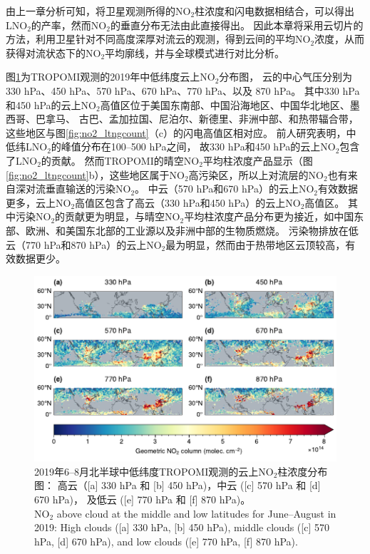 由上一章分析可知，将卫星观测所得的NO$_2$柱浓度和闪电数据相结合，可以得出LNO$_2$的产率，然而NO$_2$的垂直分布无法由此直接得出。
因此本章将采用云切片的方法，利用卫星针对不同高度深厚对流云的观测，得到云间的平均NO$_2$浓度，从而获得对流状态下的NO$_2$平均廓线，并与全球模式进行对比分析。

图\ref{fig:no2geo_tropomi}为TROPOMI观测的2019年中低纬度云上NO$_2$分布图，
云的中心气压分别为330 hPa、450 hPa、570 hPa、670 hPa、770 hPa、以及 870 hPa。
其中330 hPa和450 hPa的云上NO$_2$高值区位于美国东南部、中国沿海地区、中国华北地区、墨西哥、巴拿马、
古巴、孟加拉国、尼泊尔、新德里、非洲中部、和热带辐合带，
这些地区与图\ref{fig:no2_ltngcount}（c）的闪电高值区相对应。
前人研究表明，中低纬LNO$_2$的峰值分布在100--500 hPa之间\citep{Pickering.1988,Ott.2010,Luo.2017}，
故330 hPa和450 hPa的云上NO$_2$包含了LNO$_2$的贡献。
然而TROPOMI的晴空NO$_2$平均柱浓度产品显示（图\ref{fig:no2_ltngcount}b），这些地区属于NO$_2$高污染区，所以上对流层的NO$_2$也有来自深对流垂直输送的污染NO$_2$。
中云（570 hPa和670 hPa）的云上NO$_2$有效数据更多，云上NO$_2$高值区包含了高云（330 hPa和450 hPa）的云上NO$_2$高值区。
其中污染NO$_2$的贡献更为明显，与晴空NO$_2$平均柱浓度产品分布更为接近，如中国东部、欧洲、和美国东北部的工业源以及非洲中部的生物质燃烧。
污染物排放在低云（770 hPa和870 hPa）的云上NO$_2$最为明显，然而由于热带地区云顶较高，有效数据更少。


\begin{figure}[!htbp]
    \centering
    \includegraphics[width=15cm]{./figures/no2geo_tropomi.pdf}
    \caption{
    2019年6--8月北半球中低纬度TROPOMI观测的云上NO$_2$柱浓度分布图：
    高云（[a] 330 hPa 和 [b] 450 hPa)，中云 ([c] 570 hPa 和 [d] 670 hPa)，
    及低云 ([e] 770 hPa 和 [f] 870 hPa)。 \\
    NO$_2$ above cloud at the middle and low latitudes for June--August in 2019:
    High clouds ([a] 330 hPa, [b] 450 hPa), middle clouds ([c] 570 hPa, [d] 670 hPa),
    and low clouds ([e] 770 hPa, [f] 870 hPa).
    }
    \label{fig:no2geo_tropomi}
\end{figure}


